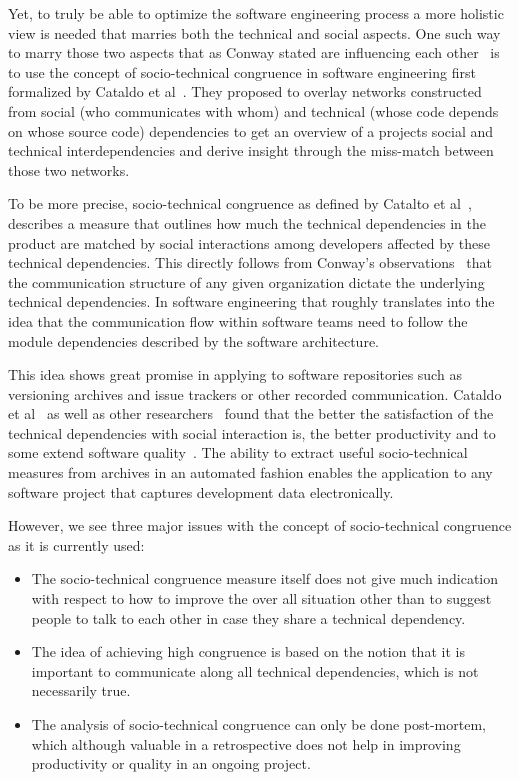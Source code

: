 Yet, to truly be able to optimize the software engineering process a more holistic view is needed that marries both the technical and social aspects.
One such way to marry those two aspects that as Conway stated are influencing each other~\cite{conway:datamination:1968} is to use the concept of socio-technical congruence in software engineering first formalized by Cataldo et al~\cite{cataldo:cscw:2006}.
They proposed to overlay networks constructed from social (who communicates with whom) and technical (whose code depends on whose source code) dependencies to get an overview of a projects social and technical interdependencies and derive insight through the miss-match between those two networks.

To be more precise, socio-technical congruence as defined by Catalto et al~\cite{cataldo:cscw:2006}, describes a measure that outlines how much the technical dependencies in the product are matched by social interactions among developers affected by these technical dependencies.
This directly follows from Conway's observations~\cite{conway:datamination:1968} that the communication structure of any given organization dictate the underlying technical dependencies.
In software engineering that roughly translates into the idea that the communication flow within software teams need to follow the module dependencies described by the software architecture. 
 
This idea shows great promise in applying to software repositories such as versioning archives and issue trackers or other recorded communication.
Cataldo et al~\cite{cataldo:cscw:2006,cataldo:esem:2008} as well as other researchers~\cite{valetto:msr:2007,ehrlich:stc:2008} found that the better the satisfaction of the technical dependencies with social interaction is, the better productivity and to some extend software quality~\cite{kwan:tse:2011,bird:issre:2009,kwan:stc:2009}.
The ability to extract useful socio-technical measures from archives in an automated fashion enables the application to any software project that captures development data electronically.

However, we see three major issues with the concept of socio-technical congruence as it is currently used:
\begin{itemize}
\item The socio-technical congruence measure itself does not give much indication with respect to how to improve the over all situation other than to suggest people to talk to each other in case they share a technical dependency. 
\item The idea of achieving high congruence is based on the notion that it is important to communicate along all technical dependencies, which is not necessarily true.
\item The analysis of socio-technical congruence can only be done post-mortem, which although valuable in a retrospective does not help in improving productivity or quality in an ongoing project.
\end{itemize}

